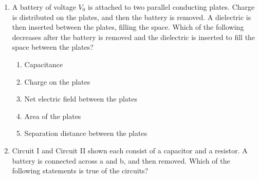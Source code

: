 \documentclass{../../../oss-classkick}
\begin{document}
\begin{multicols*}{2}
\begin{enumerate}[leftmargin=18pt,resume]
%    
%    
    
  \item A battery of voltage $V_0$ is attached to two parallel conducting
    plates. Charge is distributed on the plates, and then the battery is
    removed. A dielectric is then inserted between the plates, filling the
    space. Which of the following decreases after the battery is removed and the
    dielectric is inserted to fill the space between the plates?
    \begin{enumerate}[nosep,leftmargin=18pt,label=(\Alph*)]
    \item Capacitance
    \item Charge on the plates
    \item Net electric field between the plates
    \item Area of the plates
    \item Separation distance between the plates
    \end{enumerate}
    \vspace{.7in}
    \columnbreak
    
  \item Circuit I and Circuit II shown each consist of a capacitor and a
    resistor. A battery is connected across a and b, and then removed. Which of
    the following statements is true of the circuits?


\end{enumerate}
\end{multicols*}
\end{document}

